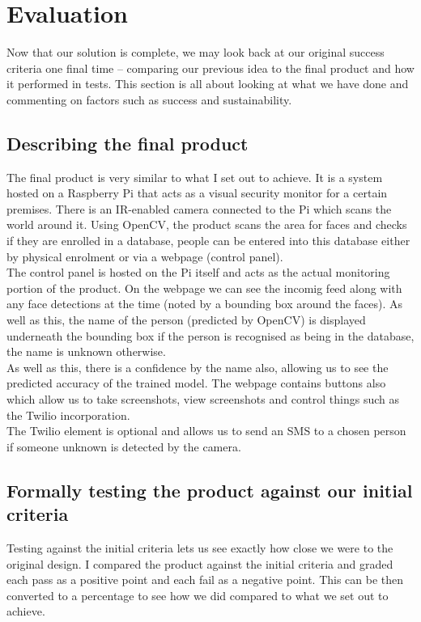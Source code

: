 \documentclass[9pt]{article}
\begin{document}
\newpage
\section{Evaluation}
Now that our solution is complete, we may look back at our original success criteria one final time -- comparing our previous idea to the final product and how it performed in tests. This section is all about looking at what we have done and commenting on factors such as success and sustainability.

\subsection{Describing the final product}
The final product is very similar to what I set out to achieve. It is a system hosted on a Raspberry Pi that acts as a visual security monitor for a certain premises. There is an IR-enabled camera connected to the Pi which scans the world around it. Using OpenCV, the product scans the area for faces and checks if they are enrolled in a database, people can be entered into this database either by physical enrolment or via a webpage (control panel).\\
The control panel is hosted on the Pi itself and acts as the actual monitoring portion of the product. On the webpage we can see the incomig feed along with any face detections at the time (noted by a bounding box around the faces). As well as this, the name of the person (predicted by OpenCV) is displayed underneath the bounding box if the person is recognised as being in the database, the name is unknown otherwise.\\
As well as this, there is a confidence by the name also, allowing us to see the predicted accuracy of the trained model. The webpage contains buttons also which allow us to take screenshots, view screenshots and control things such as the Twilio incorporation.\\
The Twilio element is optional and allows us to send an SMS to a chosen person if someone unknown is detected by the camera.

\subsection{Formally testing the product against our initial criteria}\label{ssc_testingFinal}
Testing against the initial criteria lets us see exactly how close we were to the original design. I compared the product against the initial criteria and graded each pass as a positive point and each fail as a negative point. This can be then converted to a percentage to see how we did compared to what we set out to achieve.
\end{document}
